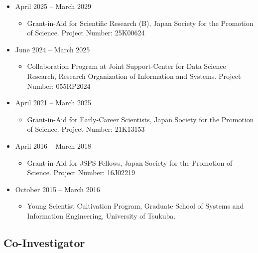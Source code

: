 \documentclass[
]{book}
\providecommand{\tightlist}{%
  \setlength{\itemsep}{0pt}\setlength{\parskip}{0pt}}
\begin{document}
\begin{itemize}
\tightlist
\item
  April 2025 -- March 2029

  \begin{itemize}
  \tightlist
  \item
    Grant-in-Aid for Scientific Research (B),
    Japan Society for the Promotion of Science.
    Project Number: 25K00624
  \end{itemize}
\item
  June 2024 -- March 2025

  \begin{itemize}
  \tightlist
  \item
    Collaboration Program at Joint Support-Center for Data Science Research,
    Research Organization of Information and Systems.
    Project Number: 055RP2024
  \end{itemize}
\item
  April 2021 -- March 2025

  \begin{itemize}
  \tightlist
  \item
    Grant-in-Aid for Early-Career Scientists,
    Japan Society for the Promotion of Science.
    Project Number: 21K13153
  \end{itemize}
\item
  April 2016 -- March 2018

  \begin{itemize}
  \tightlist
  \item
    Grant-in-Aid for JSPS Fellows,
    Japan Society for the Promotion of Science.
    Project Number: 16J02219
  \end{itemize}
\item
  October 2015 -- March 2016

  \begin{itemize}
  \tightlist
  \item
    Young Scientist Cultivation Program,
    Graduate School of Systems and Information Engineering, University of Tsukuba.
  \end{itemize}
\end{itemize}

\subsection*{Co-Investigator}\label{co-investigator}
\end{document}
